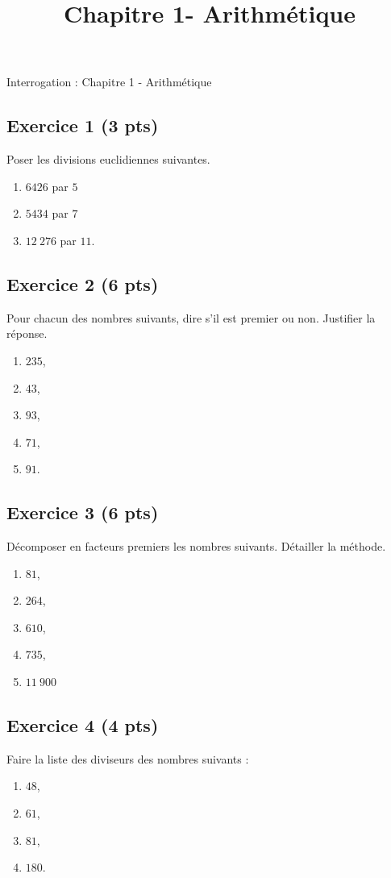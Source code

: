 \documentclass[14 pt]{extarticle}
\title{Chapitre 1-  Arithmétique}
\date{}
\theoremstyle{plain}
\begin{document}
\begin{center}{\Large Interrogation : Chapitre 1 - Arithmétique}\\ 
 \end{center}




\subsection*{Exercice 1 (3 pts)}
 Poser les divisions euclidiennes suivantes. 
 
 
 \begin{enumerate}
 \item $6426$ par $5$
 \item $5434$ par $7$ 
 \item $12~276$ par $11$. 
 \end{enumerate}
 \subsection*{Exercice 2 (6 pts)}
 
 Pour chacun des nombres suivants, dire s'il est premier ou non. Justifier la réponse. 
\begin{enumerate}
\item $235$,
\item $43$,
\item $93$,
\item $71$,
\item $91$.
\end{enumerate}

\subsection*{Exercice 3 (6 pts)}
Décomposer en facteurs premiers les nombres suivants. Détailler la méthode. 

\begin{enumerate}
\item $81$,
\item $264$,
\item $610$,
\item $735$,
\item $11~900$
\end{enumerate}
\subsection*{Exercice 4 (4 pts)}
Faire la liste des diviseurs des nombres suivants : 
\begin{enumerate}
\item $48$,
\item $61$,
\item $81$,
\item $180$.
\end{enumerate}
\end{document}
